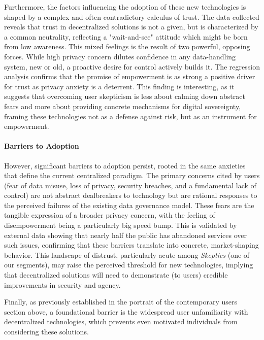 	Furthermore, the factors influencing the adoption of these new technologies is shaped by a complex and often contradictory calculus of trust. The data collected reveals that trust in decentralized solutions is not a given, but is characterized by a common neutrality, reflecting a "wait-and-see" attitude which might be born from low awareness. This mixed feelings is the result of two powerful, opposing forces. While high privacy concern dilutes confidence in any data-handling system, new or old, a proactive desire for control actively builds it. The regression analysis confirms that the promise of empowerment is as strong a positive driver for trust as privacy anxiety is a deterrent. This finding is interesting, as it suggests that overcoming user skepticism is less about calming down abstract fears and more about providing concrete mechanisms for digital sovereignty, framing these technologies not as a defense against risk, but as an instrument for empowerment.

	\paragraph{Barriers to Adoption}
	However, significant barriers to adoption persist, rooted in the same anxieties that define the current centralized paradigm. The primary concerns cited by users (fear of data misuse, loss of privacy, security breaches, and a fundamental lack of control) are not abstract dealbreakers to technology but are rational responses to the perceived failures of the existing data governance model. These fears are the tangible expression of a broader privacy concern, with the feeling of disempowerment being a particularly big speed bump. This is validated by external data showing that nearly half the public has abandoned services over such issues, confirming that these barriers translate into concrete, market-shaping behavior. This landscape of distrust, particularly acute among \textit{Skeptics} (one of our segments), may raise the perceived threshold for new technologies, implying that decentralized solutions will need to demonstrate (to users) credible improvements in security and agency.

	Finally, as previously established in the portrait of the contemporary users section above, a foundational barrier is the widespread user unfamiliarity with decentralized technologies, which prevents even motivated individuals from considering these solutions.
